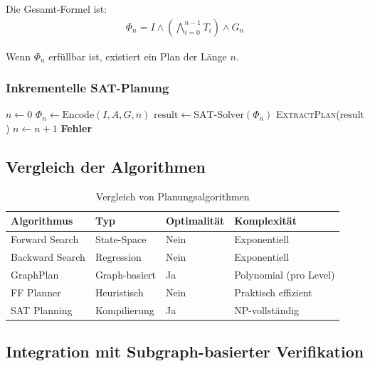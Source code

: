 ﻿\documentclass[a4paper,12pt]{article}
\theoremstyle{definition}
\begin{document}
Die Gesamt-Formel ist:
\begin{align}
\Phi_n = I \land \left(\bigwedge_{i=0}^{n-1} T_i\right) \land G_n
\end{align}

Wenn $\Phi_n$ erfüllbar ist, existiert ein Plan der Länge $n$.

\subsubsection{Inkrementelle SAT-Planung}

\begin{algorithm}[H]
	\caption{SAT-basierte Planung}
	\begin{algorithmic}[1]
		\State $n \gets 0$
		\Wiederhole
		\State $\Phi_n \gets \text{Encode}(I, A, G, n)$
		\State $\text{result} \gets \text{SAT-Solver}(\Phi_n)$
		\State \Return \textsc{ExtractPlan}($\text{result}$)
		\EndeWenn
		\State $n \gets n + 1$
		\State \Return \textbf{Fehler}
		\EndProzedur
	\end{algorithmic}
\end{algorithm}

\subsection{Vergleich der Algorithmen}

\begin{table}[h]
	\centering
	\caption{Vergleich von Planungsalgorithmen}
	\label{tab:planner_comparison}
	\begin{tabular}{llll}
		\toprule
		Algorithmus & Typ & Optimalität & Komplexität \\
		\midrule
		Forward Search & State-Space & Nein & Exponentiell \\
		Backward Search & Regression & Nein & Exponentiell \\
		GraphPlan & Graph-basiert & Ja & Polynomial (pro Level) \\
		FF Planner & Heuristisch & Nein & Praktisch effizient \\
		SAT Planning & Kompilierung & Ja & NP-vollständig \\
		\bottomrule
	\end{tabular}
\end{table}

\subsection{Integration mit Subgraph-basierter Verifikation}
\end{document}
